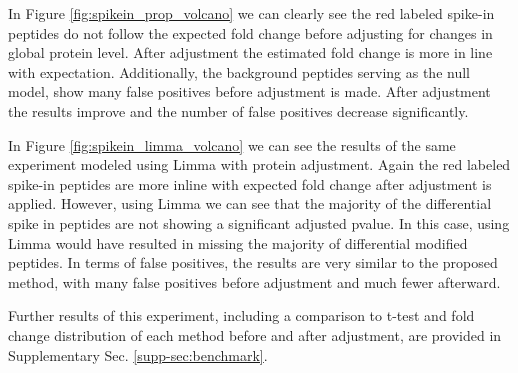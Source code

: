 \documentclass[mcp]{article}
\numberwithin{figure}{section} %
\numberwithin{table}{section}
\def\todo#1{{\color{red}[#1]}}
\begin{document}
In Figure \ref{fig:spikein_prop_volcano} we can clearly see the red labeled spike-in peptides do not follow the expected fold change before adjusting for changes in global protein level. After adjustment the estimated fold change is more in line with expectation. Additionally, the background peptides serving as the null model, show many false positives before adjustment is made. After adjustment the results improve and the number of false positives decrease significantly. 

In Figure \ref{fig:spikein_limma_volcano} we can see the results of the same experiment modeled using Limma with protein adjustment. Again the red labeled spike-in peptides are more inline with expected fold change after adjustment is applied. However, using Limma we can see that the majority of the differential spike in peptides are not showing a significant adjusted pvalue. In this case, using Limma would have resulted in missing the majority of differential modified peptides.  In terms of false positives, the results are very similar to the proposed method, with many false positives before adjustment and much fewer afterward.

Further results of this experiment, including a comparison to t-test and fold change distribution of each method before and after adjustment, are provided in Supplementary Sec. \ref{supp-sec:benchmark}. 


\end{document}
